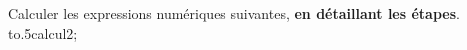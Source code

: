 \documentclass[exercice]{thedocument}%
\begin{document}
%
Calculer les expressions numériques suivantes, {\bfseries en détaillant les étapes}.\vskip10pt
\hbox{\hskip20pt\hbox to.5\linewidth{\newcalc\<calcul1;\hfill}\hbox{\newcalc\<calcul2;\hfill}}\par\medskip
\end{document}
